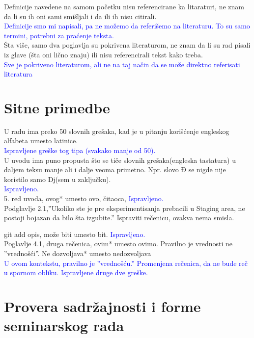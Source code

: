 \documentclass[a4paper]{report}
\newcommand{\odgovor}[1]{\textcolor{blue}{#1}}
\begin{document}
Definicije navedene na samom početku nisu referencirane ka litaraturi, ne znam da li su ih oni sami smišljali i da ili ih nisu citirali. \\
\odgovor{Definicije smo mi napisali, pa ne možemo da referišemo na literaturu. To su samo termini, potrebni za praćenje teksta.}\\
Šta više, samo dva poglavlja su pokrivena literaturom, ne znam da li su rad pisali iz glave (šta oni lično znaju) ili nisu referencirali tekst kako treba. \\
\odgovor{Sve je pokriveno literaturom, ali ne na taj način da se može direktno referisati literatura}

\section{Sitne primedbe}
U radu ima preko 50 slovnih grešaka, kad je u pitanju korišćenje engleskog alfabeta umesto latinice.\\
\odgovor{Ispravljene greške tog tipa (svakako manje od 50).}\\
U uvodu ima puno propusta što se tiče slovnih grešaka(engleska tastatura) u daljem teksu manje ali i dalje veoma primetno. Npr. slovo Đ se nigde nije koristilo samo Dj(sem u zaključku).\\
\odgovor{Ispravljeno.}\\
5. red uvoda, ovog* umesto ovo, čitaoca,\newline
\odgovor{Ispravljeno.}\\
Podglavlje 2.1,''Ukoliko ste je pre eksperimentisanja prebacili u Staging area, ne postoji bojazan da bilo šta izgubite.'' Ispraviti rečenicu, ovakva nema smisla.\newline


git add opis, može biti umesto bit.\newline
\odgovor{Ispravljeno.}\\
Poglavlje 4.1, druga rečenica, ovim* umesto ovimo. Pravilno je vrednosti ne ''vrednošći''. Ne dozvoljava* umesto nedozvoljava\\
\odgovor{U ovom kontekstu, pravilno je ''vrednošću.'' Promenjena rečenica, da ne bude reč u spornom obliku. Ispravljene druge dve greške.}\\



\section{Provera sadržajnosti i forme seminarskog rada}
\end{document}
